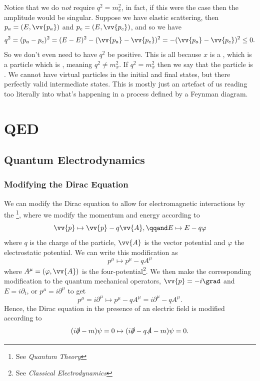 \documentclass[fleqn]{NotesClass}
\newcommand{\course}[1]{\textit{#1}}
\begin{document}
    Notice that we do \emph{not} require \(q^2 = m_x^2\), in fact, if this were the case then the amplitude would be singular.
    Suppose we have elastic scattering, then \(p_a = (E, \vv{p_a})\) and \(p_c = (E, \vv{p_c})\), and so we have
    \begin{equation}
        q^2 = (p_a - p_c)^2 = (E - E)^2 - (\vv{p_a} - \vv{p_c})^2 = -(\vv{p_a} - \vv{p_c})^2 \le 0.
    \end{equation}
    So we don't even need to have \(q^2\) be positive.
    This is all because \(x\) is a , which is a particle which is , meaning \(q^2 \ne m_x^2\).
    If \(q^2 = m_x^2\) then we say that the particle is .
    We cannot have virtual particles in the initial and final states, but there perfectly valid intermediate states.
    This is mostly just an artefact of us reading too literally into what's happening in a process defined by a Feynman diagram.
    
    \part{QED}    
    \chapter{Quantum Electrodynamics}
    \section{Modifying the Dirac Equation}
    We can modify the Dirac equation to allow for electromagnetic interactions by the \footnote{See \course{Quantum Theory}}, where we modify the momentum and energy according to
    \begin{equation}
        \vv{p} \mapsto \vv{p} - q\vv{A}, \qqand E \mapsto E - q\varphi
    \end{equation}
    where \(q\) is the charge of the particle, \(\vv{A}\) is the vector potential and \(\varphi\) the electrostatic potential.
    We can write this modification as
    \begin{equation}
        p^\mu \mapsto p^\mu - qA^\mu
    \end{equation}
    where \(A^\mu = (\varphi, \vv{A})\) is the four-potential\footnote{See \course{Classical Electrodynamics}}.
    We then make the corresponding modification to the quantum mechanical operators, \(\vv{p} = -i\grad\) and \(E = i\partial_t\), or \(p^\mu = i\partial^\mu\) to get
    \begin{equation}
        p^\mu = i\partial^\mu \mapsto p^\mu - qA^\mu = i\partial^\mu - qA^\mu.
    \end{equation}
    Hence, the Dirac equation in the presence of an electric field is modified according to
    \begin{equation}
        (i\slashed{\partial} - m)\psi = 0 \mapsto (i\slashed{\partial} - q\slashed{A} - m)\psi = 0.
    \end{equation}
    
\end{document}
